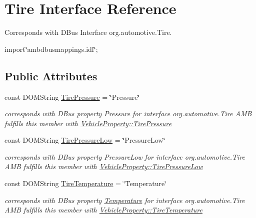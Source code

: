 \hypertarget{interfaceTire}{\section{Tire Interface Reference}
\label{interfaceTire}
}


Corresponds with D\+Bus Interface org.\+automotive.\+Tire.  




{\ttfamily import\char`\"{}ambdbusmappings.\+idl\char`\"{};}

\subsection*{Public Attributes}
\begin{DoxyCompactItemize}
\item 
\hypertarget{interfaceTire_ae9f48caaabe548696d27bc956b135e29}{const D\+O\+M\+String \hyperlink{interfaceTire_ae9f48caaabe548696d27bc956b135e29}{Tire\+Pressure} = \char`\"{}Pressure\char`\"{}}\label{interfaceTire_ae9f48caaabe548696d27bc956b135e29}

\begin{DoxyCompactList}\small\item\em corresponds with D\+Bus property Pressure for interface org.\+automotive.\+Tire A\+M\+B fulfills this member with \hyperlink{classVehicleProperty_a4709c7da616ca84dd4533562319d9bb8}{Vehicle\+Property\+::\+Tire\+Pressure} \end{DoxyCompactList}\item 
\hypertarget{interfaceTire_ac3e05d38925b7377fc2a15544cabed91}{const D\+O\+M\+String \hyperlink{interfaceTire_ac3e05d38925b7377fc2a15544cabed91}{Tire\+Pressure\+Low} = \char`\"{}Pressure\+Low\char`\"{}}\label{interfaceTire_ac3e05d38925b7377fc2a15544cabed91}

\begin{DoxyCompactList}\small\item\em corresponds with D\+Bus property Pressure\+Low for interface org.\+automotive.\+Tire A\+M\+B fulfills this member with \hyperlink{classVehicleProperty_a39e0314efcb1040a285d8d71ff5cd701}{Vehicle\+Property\+::\+Tire\+Pressure\+Low} \end{DoxyCompactList}\item 
\hypertarget{interfaceTire_ab20d18865a45ca32561df4783b15e787}{const D\+O\+M\+String \hyperlink{interfaceTire_ab20d18865a45ca32561df4783b15e787}{Tire\+Temperature} = \char`\"{}Temperature\char`\"{}}\label{interfaceTire_ab20d18865a45ca32561df4783b15e787}

\begin{DoxyCompactList}\small\item\em corresponds with D\+Bus property \hyperlink{interfaceTemperature}{Temperature} for interface org.\+automotive.\+Tire A\+M\+B fulfills this member with \hyperlink{classVehicleProperty_a6ec2a936e26226d1cb9fb84262e6adc2}{Vehicle\+Property\+::\+Tire\+Temperature} \end{DoxyCompactList}\end{DoxyCompactItemize}


